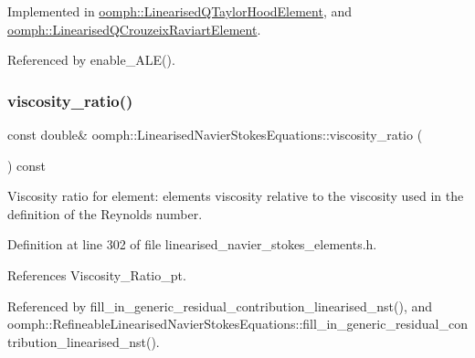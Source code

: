 Implemented in \hyperlink{classoomph_1_1LinearisedQTaylorHoodElement_aed1b1549f18cc58931bf86b67ac9e6a2}{oomph\+::\+Linearised\+Q\+Taylor\+Hood\+Element}, and \hyperlink{classoomph_1_1LinearisedQCrouzeixRaviartElement_aedc60242b651d0b81350880ac6c5d603}{oomph\+::\+Linearised\+Q\+Crouzeix\+Raviart\+Element}.



Referenced by enable\+\_\+\+A\+L\+E().

\mbox{\label{classoomph_1_1LinearisedNavierStokesEquations_ad2b1cfccb77277173df8711f8be7a7e7}} 
\subsubsection{\texorpdfstring{viscosity\+\_\+ratio()}{viscosity\_ratio()}}
{\footnotesize\ttfamily const double\& oomph\+::\+Linearised\+Navier\+Stokes\+Equations\+::viscosity\+\_\+ratio (\begin{DoxyParamCaption}{ }\end{DoxyParamCaption}) const\hspace{0.3cm}{\ttfamily [inline]}}



Viscosity ratio for element\+: element\textquotesingle{}s viscosity relative to the viscosity used in the definition of the Reynolds number. 



Definition at line 302 of file linearised\+\_\+navier\+\_\+stokes\+\_\+elements.\+h.



References Viscosity\+\_\+\+Ratio\+\_\+pt.



Referenced by fill\+\_\+in\+\_\+generic\+\_\+residual\+\_\+contribution\+\_\+linearised\+\_\+nst(), and oomph\+::\+Refineable\+Linearised\+Navier\+Stokes\+Equations\+::fill\+\_\+in\+\_\+generic\+\_\+residual\+\_\+contribution\+\_\+linearised\+\_\+nst().

\mbox{\label{classoomph_1_1LinearisedNavierStokesEquations_aa74c9a1061c77f49cfba75ae93fe5c2b}} 
